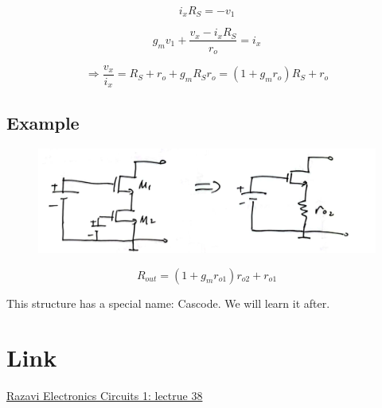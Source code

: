 \documentclass[fontset=windows]{article}
\begin{document}
$$i_xR_S=-v_1$$

$$g_mv_1+\frac{v_x-i_xR_S}{r_o}=i_x$$

$$\Longrightarrow \frac{v_x}{i_x}=R_S+r_o+g_mR_Sr_o=(1+g_mr_o)R_S+r_o$$

\subsection*{Example}

\begin{figure}[htbp]
    \centering
    \includegraphics[scale=0.8]{7.jpg}
    \captionsetup{labelformat=empty}
    \caption{}
    \label{7}
\end{figure}

$$R_{out}=(1+g_mr_{o1})r_{o2}+r_{o1}$$

This structure has a special name: Cascode. We will learn it after. 

\section*{Link}

\href{https://www.bilibili.com/video/BV1FD4y1R7Ah?p=38&vd_source=1d0c07486a3bd3b0adb8ac548bf6453e}{Razavi Electronics Circuits 1: lectrue 38}
\end{document}
